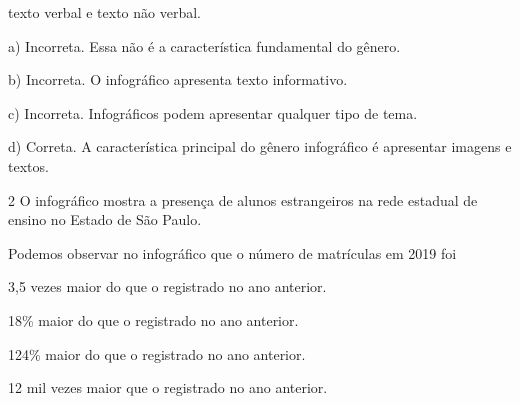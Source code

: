 \begin{escolha}
\begin{escolha}
\begin{boxlist}
\item texto verbal e texto não verbal.
\end{boxlist}


a)  Incorreta. Essa não é a característica fundamental do gênero.

b)  Incorreta. O infográfico apresenta texto informativo.

c)  Incorreta. Infográficos podem apresentar qualquer tipo de tema.

d)  Correta. A característica principal do gênero infográfico é
apresentar imagens e textos.

\num{2} O infográfico mostra a presença de alunos estrangeiros na rede
estadual de ensino no Estado de São Paulo.



Podemos observar no infográfico que o número de matrículas em 2019 foi

\begin{escolha}
\item 3,5 vezes maior do que o registrado no ano anterior.

\item 18\% maior do que o registrado no ano anterior.

\item 124\% maior do que o registrado no ano anterior.

\item 12 mil vezes maior que o registrado no ano anterior.
\end{escolha}



\end{escolha}
\end{escolha}
